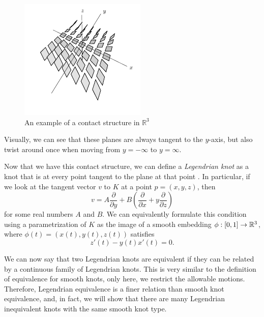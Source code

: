 \documentclass{article}
\begin{document}
\begin{figure}[h!]
    \includegraphics[width=\linewidth]{cStructure.png}
    \caption{An example of a contact structure in $\mathbb{R}^3$}
    \label{fig:knot1}
\end{figure}

Visually, we can see that these planes are always tangent to the $y$-axis, but also
twist around once when moving from $y = -\infty$ to $y = \infty$.

Now that we have this contact structure, we can define a {\it Legendrian knot}
as a knot that is at every point tangent to the plane at that point \cite{sabloffAMS}.
In particular, if we look at the tangent vector $v$ to $K$ at a point $p = (x,y,z)$,
then
\[ v = A\frac{\partial}{\partial y} + B\left(\frac{\partial}{\partial x} +y\frac{\partial}{\partial z}\right)\]
for some real numbers $A$ and $B$.
We can equivalently formulate this condition using a parametrization of $K$ as
the image of a smooth embedding $\phi : [0,1] \to \mathbb{R}^3$, where $\phi(t) = (x(t),y(t),z(t))$ satisfies
\[ z'(t)-y(t)x'(t) = 0.\]

We can now say that two Legendrian knots are equivalent if they can be related by a continuous
family of Legendrian knots. This is very similar to the definition of equivalence
for smooth knots, only here, we restrict the allowable motions.
Therefore, Legendrian equivalence is a finer relation than smooth knot equivalence,
and, in fact, we will show that there are many Legendrian inequivalent knots
with the same smooth knot type.
\end{document}
